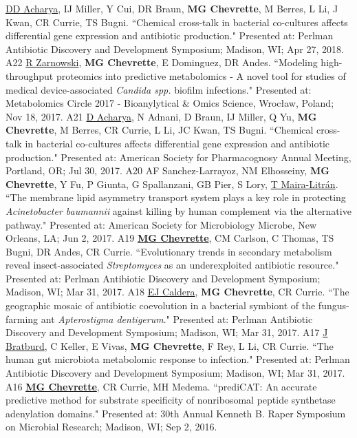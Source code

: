 \begin{cvpubs}
  \cvpub
    {\underline{DD Acharya}, IJ Miller, Y Cui, DR Braun, \textbf{MG Chevrette}, M Berres, L Li, J Kwan, CR Currie, TS Bugni. ``Chemical cross-talk in bacterial co-cultures affects differential gene expression and antibiotic production." Presented at: Perlman Antibiotic Discovery and Development Symposium; Madison, WI; Apr 27, 2018.} %
    {A22} %
  \cvpub
    {\underline{R Zarnowski}, \textbf{MG Chevrette}, E Dominguez, DR Andes. ``Modeling high-throughput proteomics into predictive metabolomics - A novel tool for studies of medical device-associated \textit{Candida spp.} biofilm infections." Presented at: Metabolomics Circle 2017 - Bioanylytical \& Omics Science, Wrocław, Poland; Nov 18, 2017.} %
    {A21} %
  \cvpub
    {\underline{D Acharya}, N Adnani, D Braun, IJ Miller, Q Yu, \textbf{MG Chevrette}, M Berres, CR Currie, L Li, JC Kwan, TS Bugni. ``Chemical cross-talk in bacterial co-cultures affects differential gene expression and antibiotic production." Presented at: American Society for Pharmacognosy Annual Meeting, Portland, OR; Jul 30, 2017.} %
    {A20} %
  \cvpub
    {AF Sanchez-Larrayoz, NM Elhosseiny, \textbf{MG Chevrette}, Y Fu, P Giunta, G Spallanzani, GB Pier, S Lory, \underline{T Maira-Litr\'{a}n}. ``The membrane lipid asymmetry transport system plays a key role in protecting \textit{Acinetobacter baumannii} against killing by human complement via the alternative pathway." Presented at: American Society for Microbiology Microbe, New Orleans, LA; Jun 2, 2017.} %
    {A19} %
  \cvpub
    {\underline{\textbf{MG Chevrette}}, CM Carlson, C Thomas, TS Bugni, DR Andes, CR Currie. ``Evolutionary trends in secondary metabolism reveal insect-associated \textit{Streptomyces} as an underexploited antibiotic resource." Presented at: Perlman Antibiotic Discovery and Development Symposium; Madison, WI; Mar 31, 2017.} %
    {A18} %
  \cvpub
    {\underline{EJ Caldera}, \textbf{MG Chevrette}, CR Currie. ``The geographic mosaic of antibiotic coevolution in a bacterial symbiont of the fungus-farming ant \textit{Apterostigma dentigerum}." Presented at: Perlman Antibiotic Discovery and Development Symposium; Madison, WI; Mar 31, 2017.} %
    {A17} %
  \cvpub
    {\underline{J Bratburd}, C Keller, E Vivas, \textbf{MG Chevrette}, F Rey, L Li, CR Currie. ``The human gut microbiota metabolomic response to infection." Presented at: Perlman Antibiotic Discovery and Development Symposium; Madison, WI; Mar 31, 2017.} %
    {A16} %
  \cvpub
    {\textbf{\underline{MG Chevrette}}, CR Currie, MH Medema.  ``prediCAT: An accurate predictive method for substrate specificity of nonribosomal peptide synthetase adenylation domains." Presented at: 30th Annual Kenneth B. Raper Symposium on Microbial Research; Madison, WI; Sep 2, 2016.} %

\end{cvpubs}

